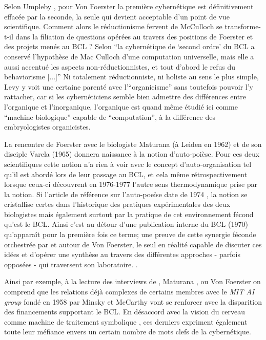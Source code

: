 Selon Umpleby \autocite{Umpleby2003}, pour Von Foerster la première cybernétique est définitivement effacée par la seconde, la seule qui devient acceptable d'un point de vue scientifique. Comment alors le réductionisme fervent de McCulloch se transforme-t-il dans la filiation de questions opérées au travers des positions de Foerster et des projets menés au BCL ? Selon \textcite[120-122]{Livet1985} \enquote{la cybernétique de \enquote{second ordre} du BCL a conservé l'hypothèse de Mac Culloch d'une computation universelle, mais elle a aussi accentué les aspects non-réductionnistes, et tout d'abord le refus du behaviorisme [...]} Ni totalement réductionniste, ni holiste au sens le plus simple, Levy y voit une certaine parenté avec l'\enquote{organicisme} sans toutefois pouvoir l'y rattacher, car si les cybernéticiens semble bien admettre des différences entre l'organique et l'inorganique, l'organique est quand même étudié ici comme \enquote{machine biologique} capable de \enquote{computation}, à la différence des embryologistes organicistes.

La rencontre de Foerster avec le biologiste Maturana (à Leiden en 1962) et de son disciple Varela (1965) donnera naissance à la notion d'auto-poièse. Pour ces deux scientifiques cette notion n'a rien à voir avec le concept d'auto-organisation tel qu'il est abordé lors de leur passage au BCL, et cela même rétrospectivement lorsque ceux-ci découvrent en 1976-1977 l'autre sens thermodynamique prise par la notion. Si l'article de référence sur l'auto-poeïse date de 1974 \autocite{Varela1974}, la notion se cristallise certes dans l'historique des pratiques expérimentales des deux biologistes mais également surtout par la pratique de cet environnement fécond qu'est le BCL. Ainsi c'est au détour d'une publication interne du BCL (1970) qu’apparaît pour la première fois ce terme; une preuve de cette synergie féconde orchestrée par et autour de Von Foerster, le seul en réalité capable de discuter ces idées et d'opérer une synthèse au travers des différentes approches - parfois opposées -  qui traversent son laboratoire. \autocites[283-287]{CREA1985}{Muller2007b, Varela1995}. 
 
Ainsi par exemple, à la lecture des interviews de \textcite{Varela1995}, Maturana \autocite{Muller2007b}, ou Von Foerster \autocite{Franchi1995} on comprend que les relations déjà complexes de certains membres avec le \textit{MIT AI group} fondé en 1958 par Minsky et McCarthy vont se renforcer avec la disparition des financements supportant le BCL. En désaccord avec la vision du cerveau comme machine de traitement symbolique \autocite[43]{Muller2007b}, ces derniers expriment également toute leur méfiance envers un certain nombre de mots clefs de la cybernétique. 

